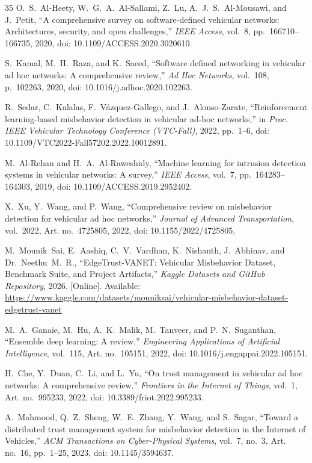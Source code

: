 \documentclass[conference]{IEEEtran}
\begin{document}
\begin{thebibliography}{35}
O.~S.~Al-Heety, W.~G.~A.~Al-Sallami, Z.~Lu, A.~J.~S.~Al-Mousawi, and J.~Petit,
``A comprehensive survey on software-defined vehicular networks: Architectures, security, and open challenges,''
\textit{IEEE Access}, vol.~8, pp.~166710--166735, 2020, doi: 10.1109/ACCESS.2020.3020610.

S.~Kamal, M.~H.~Raza, and K.~Saeed,
``Software defined networking in vehicular ad hoc networks: A comprehensive review,''
\textit{Ad Hoc Networks}, vol.~108, p.~102263, 2020, doi: 10.1016/j.adhoc.2020.102263.

R.~Sedar, C.~Kalalas, F.~V{\'a}zquez-Gallego, and J.~Alonso-Zarate,
``Reinforcement learning-based misbehavior detection in vehicular ad-hoc networks,''
in \textit{Proc. IEEE Vehicular Technology Conference (VTC-Fall)}, 2022, pp.~1--6, doi: 10.1109/VTC2022-Fall57202.2022.10012891.

M.~Al-Rehan and H.~A.~Al-Raweshidy,
``Machine learning for intrusion detection systems in vehicular networks: A survey,''
\textit{IEEE Access}, vol.~7, pp.~164283--164303, 2019, doi: 10.1109/ACCESS.2019.2952402.

X.~Xu, Y.~Wang, and P.~Wang,
``Comprehensive review on misbehavior detection for vehicular ad hoc networks,''
\textit{Journal of Advanced Transportation}, vol.~2022, Art. no.~4725805, 2022, doi: 10.1155/2022/4725805.

M.~Mounik~Sai, E.~Aashiq, C.~V.~Vardhan, K.~Nishanth, J.~Abhinav, and Dr.~Neethu~M.~R.,
``EdgeTrust-VANET: Vehicular Misbehavior Dataset, Benchmark Suite, and Project Artifacts,''
\textit{Kaggle Datasets and GitHub Repository}, 2026. [Online]. Available: \url{https://www.kaggle.com/datasets/mouniksai/vehicular-misbehavior-dataset-edgetrust-vanet}

M.~A.~Ganaie, M.~Hu, A.~K.~Malik, M.~Tanveer, and P.~N.~Suganthan,
``Ensemble deep learning: A review,''
\textit{Engineering Applications of Artificial Intelligence}, vol.~115, Art. no.~105151, 2022, doi: 10.1016/j.engappai.2022.105151.

H.~Che, Y.~Duan, C.~Li, and L.~Yu,
``On trust management in vehicular ad hoc networks: A comprehensive review,''
\textit{Frontiers in the Internet of Things}, vol.~1, Art. no.~995233, 2022, doi: 10.3389/friot.2022.995233.

A.~Mahmood, Q.~Z.~Sheng, W.~E.~Zhang, Y.~Wang, and S.~Sagar,
``Toward a distributed trust management system for misbehavior detection in the Internet of Vehicles,''
\textit{ACM Transactions on Cyber-Physical Systems}, vol.~7, no.~3, Art. no.~16, pp.~1--25, 2023, doi: 10.1145/3594637.


\end{thebibliography}
\end{document}
